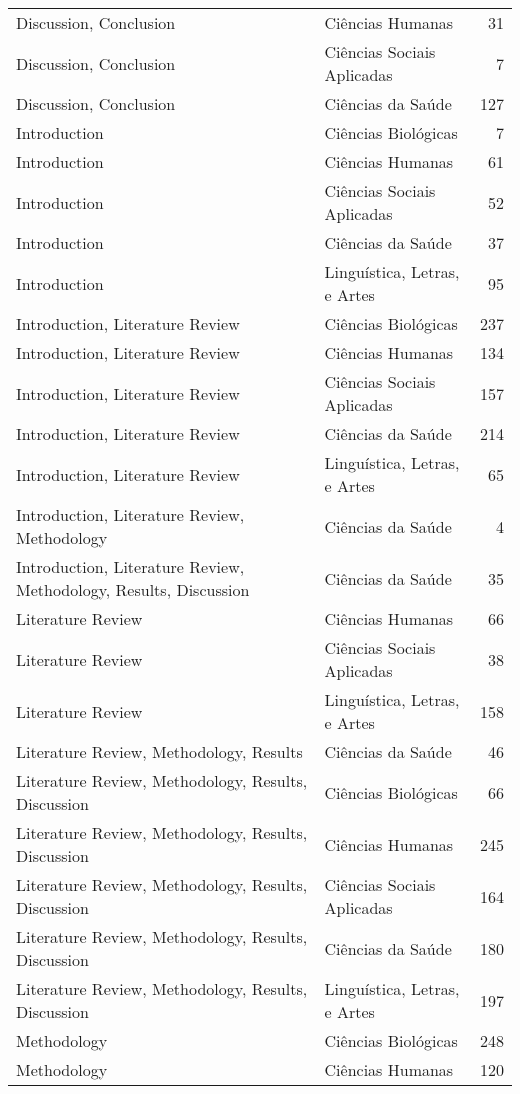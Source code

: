 \begin{longtable}{llr}
Discussion, Conclusion & Ciências Humanas & 31 \\
Discussion, Conclusion & Ciências Sociais Aplicadas & 7 \\
Discussion, Conclusion & Ciências da Saúde & 127 \\
Introduction & Ciências Biológicas & 7 \\
Introduction & Ciências Humanas & 61 \\
Introduction & Ciências Sociais Aplicadas & 52 \\
Introduction & Ciências da Saúde & 37 \\
Introduction & Linguística, Letras, e Artes & 95 \\
Introduction, Literature Review & Ciências Biológicas & 237 \\
Introduction, Literature Review & Ciências Humanas & 134 \\
Introduction, Literature Review & Ciências Sociais Aplicadas & 157 \\
Introduction, Literature Review & Ciências da Saúde & 214 \\
Introduction, Literature Review & Linguística, Letras, e Artes & 65 \\
Introduction, Literature Review, Methodology & Ciências da Saúde & 4 \\
Introduction, Literature Review, Methodology, Results, Discussion & Ciências da Saúde & 35 \\
Literature Review & Ciências Humanas & 66 \\
Literature Review & Ciências Sociais Aplicadas & 38 \\
Literature Review & Linguística, Letras, e Artes & 158 \\
Literature Review, Methodology, Results & Ciências da Saúde & 46 \\
Literature Review, Methodology, Results, Discussion & Ciências Biológicas & 66 \\
Literature Review, Methodology, Results, Discussion & Ciências Humanas & 245 \\
Literature Review, Methodology, Results, Discussion & Ciências Sociais Aplicadas & 164 \\
Literature Review, Methodology, Results, Discussion & Ciências da Saúde & 180 \\
Literature Review, Methodology, Results, Discussion & Linguística, Letras, e Artes & 197 \\
Methodology & Ciências Biológicas & 248 \\
Methodology & Ciências Humanas & 120 \\

\end{longtable}
